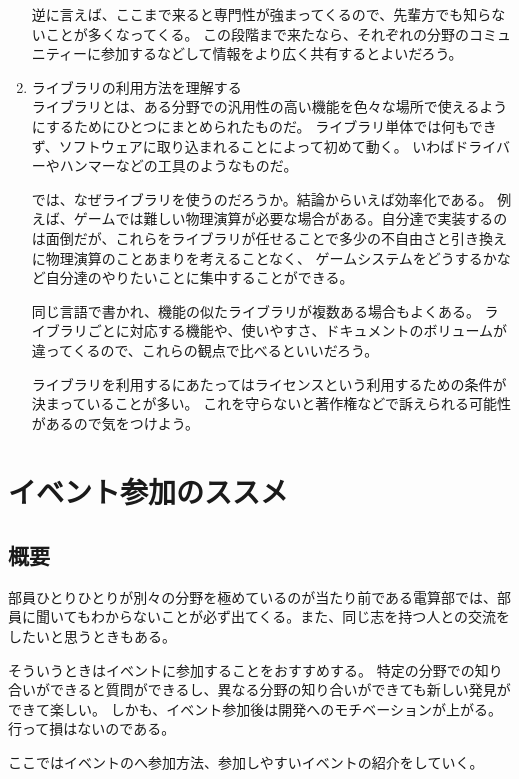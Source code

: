 \documentclass[lualatex,ja=standard,12pt,a4j]{bxjsbook}
\begin{document}
\begin{enumerate}
                逆に言えば、ここまで来ると専門性が強まってくるので、先輩方でも知らないことが多くなってくる。
                この段階まで来たなら、それぞれの分野のコミュニティーに参加するなどして情報をより広く共有するとよいだろう。
				
				\item ライブラリの利用方法を理解する\\
		        ライブラリとは、ある分野での汎用性の高い機能を色々な場所で使えるようにするためにひとつにまとめられたものだ。
		        ライブラリ単体では何もできず、ソフトウェアに取り込まれることによって初めて動く。
		        いわばドライバーやハンマーなどの工具のようなものだ。
		        
		        では、なぜライブラリを使うのだろうか。結論からいえば効率化である。
		        例えば、ゲームでは難しい物理演算が必要な場合がある。自分達で実装するのは面倒だが、これらをライブラリが任せることで多少の不自由さと引き換えに物理演算のことあまりを考えることなく、
		        ゲームシステムをどうするかなど自分達のやりたいことに集中することができる。
		        
		        同じ言語で書かれ、機能の似たライブラリが複数ある場合もよくある。
		        ライブラリごとに対応する機能や、使いやすさ、ドキュメントのボリュームが違ってくるので、これらの観点で比べるといいだろう。 
		        
		        ライブラリを利用するにあたってはライセンスという利用するための条件が決まっていることが多い。
		        これを守らないと著作権などで訴えられる可能性があるので気をつけよう。           
			\end{enumerate}
		\section{イベント参加のススメ}
			\subsection{概要}
				部員ひとりひとりが別々の分野を極めているのが当たり前である電算部では、部員に聞いてもわからないことが必ず出てくる。また、同じ志を持つ人との交流をしたいと思うときもある。
				
				そういうときはイベントに参加することをおすすめする。
				特定の分野での知り合いができると質問ができるし、異なる分野の知り合いができても新しい発見ができて楽しい。
				しかも、イベント参加後は開発へのモチベーションが上がる。
				行って損はないのである。
				
				ここではイベントのへ参加方法、参加しやすいイベントの紹介をしていく。
\end{document}
